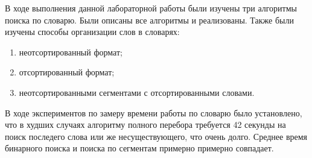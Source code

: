 \Conclusion
    В ходе выполнения данной лабораторной работы были изучены три алгоритмы поиска по словарю.
    Были описаны все алгоритмы и реализованы. 
    Также были изучены способы организации слов в словарях:
    \begin{enumerate}
        \item неотсортированный формат;
        \item отсортированный формат;
        \item неотсортированными сегментами с отсортированными словами.
    \end{enumerate}
    
    В ходе экспериментов по замеру времени работы по словарю
    было установлено, что 
    в худших случаях алгоритму полного перебора требуется 42 секунды 
    на поиск последего слова или же несуществующего, что очень долго.
    Среднее время бинарного поиска и поиска по сегментам примерно примерно совпадает.


